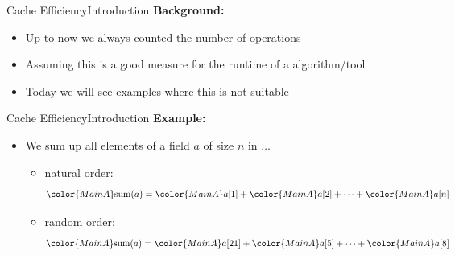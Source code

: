 

\begin{frame}{Cache Efficiency}{Introduction}
  \textbf{Background:}
  \begin{itemize}
    \item<2->
      Up to now we always counted the {\color{MainA}number of operations}
    \item<2->
      Assuming this is a good measure for the runtime of a algorithm/tool
    \item<3->
      Today we will see examples where this is not suitable
  \end{itemize}
\end{frame}


\begin{frame}{Cache Efficiency}{Introduction}
  \textbf{Example:}
  \begin{itemize}
    \item
      We sum up all elements of a field {\color{MainA}$a$} of size
      {\color{MainA}$n$} in $\ldots$
    \begin{itemize}
      \item
        natural order:
        \begin{displaymath}
          {\color{MainA}\mathrm{sum}(a)} =
          {\color{MainA}a[1]} +
          {\color{MainA}a[2]} +
          \dots +
          {\color{MainA}a[n]}
        \end{displaymath}
      \item
        random order:
        \begin{displaymath}
          {\color{MainA}\mathrm{sum}(a)} =
          {\color{MainA}a[21]} +
          {\color{MainA}a[5]} +
          \dots +
          {\color{MainA}a[8]}
        \end{displaymath}
    \end{itemize}
  \end{itemize}
\end{frame}



